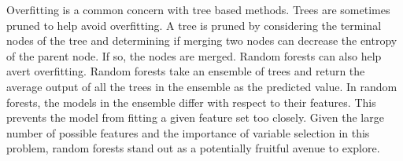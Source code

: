\documentclass{sig-alternate-05-2015}
\begin{document}
\par{} Overfitting is a common concern with tree based methods. Trees are sometimes pruned to help avoid overfitting. A tree is pruned by considering the terminal nodes of the tree and determining if merging two nodes can decrease the entropy of the parent node. If so, the nodes are merged. Random forests can also help avert overfitting. Random forests take an ensemble of trees and return the average output of all the trees in the ensemble as the predicted value. In random forests, the models in the ensemble differ with respect to their features. This prevents the model from fitting a given feature set too closely. Given the large number of possible features and the importance of variable selection in this problem, random forests stand out as a potentially fruitful avenue to explore.
\end{document}
